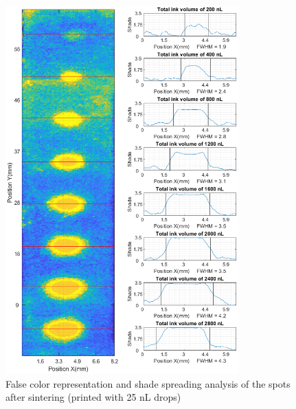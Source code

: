 \begin{figure}[H]
	\centering
	\includegraphics[width=0.8\textwidth]{grafiken/drops25.eps}
	\caption{False color representation and shade spreading analysis of the spots after sintering (printed with 25 nL drops)}
	\label{fig:drops25}
\end{figure} 

\bigskip 

\bigskip

